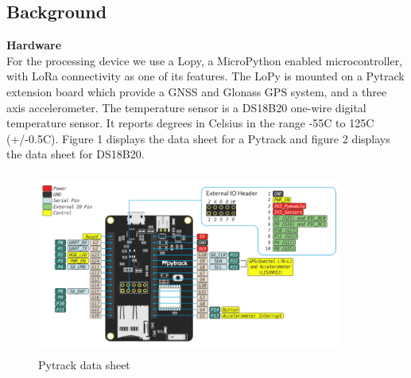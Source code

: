 	\subsection{Background}
		\textbf{Hardware} \\
		For the processing device we use a Lopy, a MicroPython enabled microcontroller, with LoRa connectivity as one of its features.  The LoPy is mounted on a Pytrack extension board which provide a GNSS and Glonass GPS system, and a three axis accelerometer.  The temperature sensor is a DS18B20 one-wire digital temperature sensor. It reports degrees in Celsius in the range -55C to 125C (+/-0.5C)\cite{tempsensor}. Figure 1 displays the data sheet for a Pytrack and figure 2 displays the data sheet for DS18B20.
		\\
		\begin{figure}[h]
			\caption{Pytrack data sheet}
			\includegraphics[width=10cm, height=6cm]{pytrackdatasheet}
		\end{figure}
		
